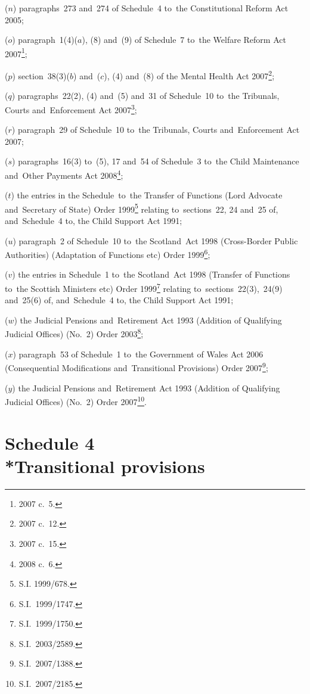 \documentclass[12pt,a4paper]{article}
\begin{document}
\begin{enumerate}
($n$) paragraphs~273 and~274 of Schedule~4 to~the Constitutional Reform Act 2005;

($o$) paragraph~1(4)($a$), (8) and~(9) of Schedule~7 to~the Welfare Reform Act 2007\footnote{2007 c.~5.};

($p$) section~38(3)($b$)  and~($c$), (4) and~(8) of the Mental Health Act 2007\footnote{2007 c.~12.};

($q$) paragraphs~22(2), (4) and~(5) and~31 of Schedule~10 to~the Tribunals, Courts and~Enforcement Act 2007\footnote{2007 c.~15.};

($r$) paragraph~29 of Schedule~10 to~the Tribunals, Courts and~Enforcement Act 2007;

\eject

($s$) paragraphs~16(3) to~(5), 17 and~54 of Schedule~3 to~the Child Maintenance and~Other Payments Act 2008\footnote{2008 c.~6.};

($t$) the entries in the Schedule~to~the Transfer of Functions (Lord Advocate and~Secretary of State) Order 1999\footnote{S.I. 1999/678.} relating to~sections~22, 24 and~25 of, and~Schedule~4 to, the Child Support Act 1991;

($u$) paragraph~2 of Schedule~10 to~the Scotland~Act 1998 (Cross-Border Public Authorities) (Adaptation of Functions etc) Order 1999\footnote{S.I.~1999/1747.};

($v$)  the entries in Schedule~1 to~the Scotland~Act 1998 (Transfer of Functions to~the Scottish Ministers etc) Order 1999\footnote{S.I.~1999/1750.} relating to~sections~22(3),~24(9) and~25(6) of, and~Schedule~4 to, the Child Support Act 1991;

($w$) the Judicial Pensions and~Retirement Act 1993 (Addition of Qualifying Judicial Offices) (No.~2) Order 2003\footnote{S.I.~2003/2589.};

($x$) paragraph~53 of Schedule~1 to~the Government of Wales Act 2006 (Consequential Modifications and~Transitional Provisions) Order 2007\footnote{S.I.~2007/1388.};

($y$) the Judicial Pensions and~Retirement Act 1993 (Addition of Qualifying Judicial Offices) (No.~2) Order 2007\footnote{S.I.~2007/2185.}.
\end{enumerate}

\part[Schedule 4 --- Transitional provisions]{Schedule 4\\*Transitional provisions}
\end{document}
